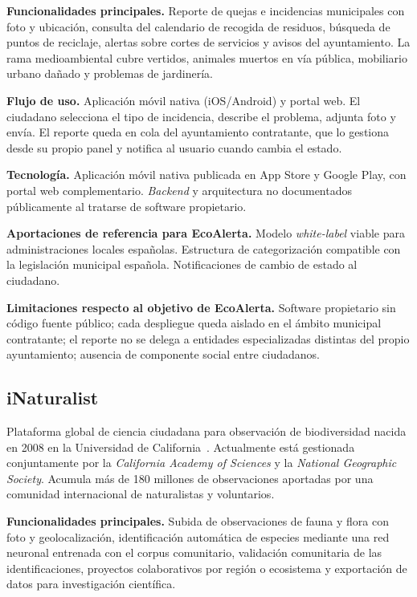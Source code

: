 \textbf{Funcionalidades principales.}  Reporte de quejas e incidencias municipales con foto y ubicación, consulta del calendario de recogida de residuos, búsqueda de puntos de reciclaje, alertas sobre cortes de servicios y avisos del ayuntamiento. La rama medioambiental cubre vertidos, animales muertos en vía pública, mobiliario urbano dañado y problemas de jardinería.

\textbf{Flujo de uso.}  Aplicación móvil nativa (iOS/Android) y portal web. El ciudadano selecciona el tipo de incidencia, describe el problema, adjunta foto y envía. El reporte queda en cola del ayuntamiento contratante, que lo gestiona desde su propio panel y notifica al usuario cuando cambia el estado.

\textbf{Tecnología.}  Aplicación móvil nativa publicada en App Store y Google Play, con portal web complementario. \textit{Backend} y arquitectura no documentados públicamente al tratarse de software propietario.

\textbf{Aportaciones de referencia para EcoAlerta.}  Modelo \textit{white-label} viable para administraciones locales españolas. Estructura de categorización compatible con la legislación municipal española. Notificaciones de cambio de estado al ciudadano.

\textbf{Limitaciones respecto al objetivo de EcoAlerta.}  Software propietario sin código fuente público; cada despliegue queda aislado en el ámbito municipal contratante; el reporte no se delega a entidades especializadas distintas del propio ayuntamiento; ausencia de componente social entre ciudadanos.


\subsection{iNaturalist}
\label{subsec:inaturalist}

Plataforma global de ciencia ciudadana para observación de biodiversidad nacida en 2008 en la Universidad de California~\parencite{inaturalist}. Actualmente está gestionada conjuntamente por la \textit{California Academy of Sciences} y la \textit{National Geographic Society}. Acumula más de 180 millones de observaciones aportadas por una comunidad internacional de naturalistas y voluntarios.

\textbf{Funcionalidades principales.}  Subida de observaciones de fauna y flora con foto y geolocalización, identificación automática de especies mediante una red neuronal entrenada con el corpus comunitario, validación comunitaria de las identificaciones, proyectos colaborativos por región o ecosistema y exportación de datos para investigación científica.

